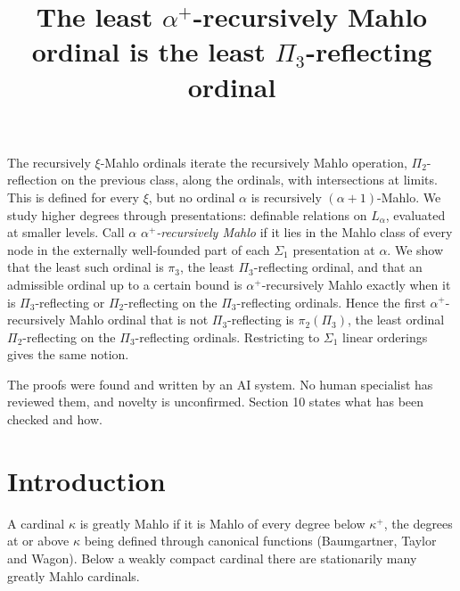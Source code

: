 \documentclass[11pt]{article}
\title{The least $\alpha^+$-recursively Mahlo ordinal is the least $\Pi_3$-reflecting ordinal}
\date{\paperversion}
\begin{document}
\maketitle

\begin{frontnote} The recursively $\xi$-Mahlo ordinals iterate the recursively Mahlo operation,
$\Pi_2$-reflection on the previous class, along the ordinals, with intersections at limits. This is defined for
every $\xi$, but no ordinal $\alpha$ is recursively $(\alpha+1)$-Mahlo. We study higher degrees through
presentations: definable relations on $L_{\alpha}$, evaluated at smaller levels. Call $\alpha$
\emph{$\alpha^+$-recursively Mahlo} if it lies in the Mahlo class of every node in the externally
well-founded part of each $\Sigma_1$ presentation at $\alpha$. We show that the least such ordinal is $\pi_3$, the
least $\Pi_3$-reflecting ordinal, and that an admissible ordinal up to a certain bound is $\alpha^+$-recursively
Mahlo exactly when it is $\Pi_3$-reflecting or $\Pi_2$-reflecting on the $\Pi_3$-reflecting ordinals. Hence the
first $\alpha^+$-recursively Mahlo ordinal that is not $\Pi_3$-reflecting is $\pi_2(\Pi_3)$, the least ordinal
$\Pi_2$-reflecting on the $\Pi_3$-reflecting ordinals. Restricting to $\Sigma_1$ linear orderings gives the same
notion.
\end{frontnote}

\begin{frontnote} The proofs were found and written by an AI system. No human specialist has
reviewed them, and novelty is unconfirmed. Section 10 states what has been checked and how.
\end{frontnote}

\section{Introduction}

A cardinal $\kappa$ is greatly Mahlo if it is Mahlo of every degree below $\kappa^+$, the degrees at or above $\kappa$
being defined through canonical functions (Baumgartner, Taylor and Wagon). Below a weakly compact cardinal there are
stationarily many greatly Mahlo cardinals.
\end{document}
